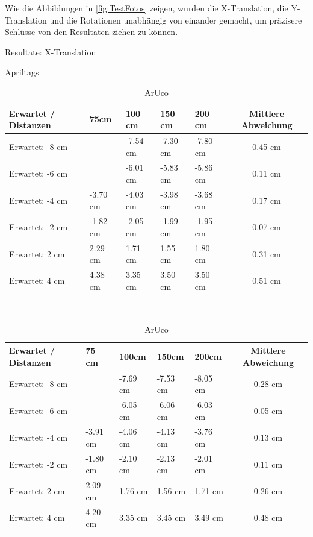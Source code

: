 Wie die Abbildungen in \ref{fig:TestFotos} zeigen, wurden die X-Translation, die Y-Translation und die Rotationen
unabhängig von einander gemacht, um präzisere Schlüsse von den Resultaten ziehen zu können.



\begin{table}[!htb]
    \caption{Resultate: X-Translation}
    \label{tab:xTrans}
    \begin{subtable}{.5\linewidth}
        \caption{Apriltags}
        \label{tab:xTransApril}
        \begin{tabular}{|l|l|l|l|l|c|}
            \hline
            Erwartet / Distanzen & 75cm & 100 cm & 150 cm & 200 cm  & Mittlere Abweichung\\
            \hline
            Erwartet: -8 cm &          & -7.54 cm & -7.30 cm & -7.80 cm & 0.45 cm\\
            \hline
            Erwartet: -6 cm &          & -6.01 cm & -5.83 cm  & -5.86 cm & 0.11 cm\\
            \hline
            Erwartet: -4 cm & -3.70 cm & -4.03 cm & -3.98 cm & -3.68 cm & 0.17 cm\\
            \hline
            Erwartet: -2 cm & -1.82 cm & -2.05 cm & -1.99 cm & -1.95 cm & 0.07 cm\\
            \hline
            Erwartet: 2 cm  & 2.29 cm & 1.71 cm & 1.55 cm & 1.80 cm & 0.31 cm\\
            \hline
            Erwartet: 4 cm  & 4.38 cm & 3.35 cm  & 3.50 cm & 3.50 cm & 0.51 cm\\
            \hline
        \end{tabular}
    \end{subtable}
    \\[\smallskipamount]
    \begin{subtable}{.5\linewidth}
        \caption{ArUco}
        \label{tab:xTransAruco}
        \begin{tabular}{|l|l|l|l|l|c|}
            \hline
            Erwartet / Distanzen & 75 cm & 100cm & 150cm & 200cm & Mittlere Abweichung\\
            \hline
            Erwartet:   -8 cm &          & -7.69 cm & -7.53 cm  & -8.05 cm & 0.28 cm\\
            \hline
            Erwartet:   -6 cm &          & -6.05 cm & -6.06 cm & -6.03 cm & 0.05 cm \\
            \hline
            Erwartet:   -4 cm & -3.91 cm & -4.06 cm & -4.13 cm & -3.76 cm & 0.13 cm \\
            \hline
            Erwartet:   -2 cm & -1.80 cm & -2.10 cm & -2.13 cm & -2.01 cm &  0.11 cm\\
            \hline
            Erwartet:   2 cm  & 2.09 cm & 1.76 cm & 1.56 cm & 1.71 cm & 0.26 cm\\
            \hline
            Erwartet:   4 cm  & 4.20 cm & 3.35 cm & 3.45 cm & 3.49 cm & 0.48 cm \\
            \hline
        \end{tabular}
    \end{subtable} 
\end{table}

